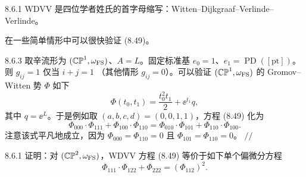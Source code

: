 \begin{wrem}{8.6.1}
WDVV 是四位学者姓氏的首字母缩写：Witten--Dijkgraaf--Verlinde--Verlinde。
\end{wrem}

在一些简单情形中可以很快验证 (8.49)。

\begin{wexam}{8.6.3}
取辛流形为 $(\mathbb{CP}^1,\omega_{\mathrm{FS}})$、$A=L$。固定标准基
$e_0=1$、$e_1=\operatorname{PD}([\mathrm{pt}])$。则 $g_{ij}=1$ 仅当 $i+j=1$
（其他情形 $g_{ij}=0$）。可以验证 $(\mathbb{CP}^1,\omega_{\mathrm{FS}})$ 的 Gromov--Witten
势 $\Phi$ 如下
\[
  \Phi(t_0,t_1)=\frac{t_0^2t_1}{2}+\ee^{t_1}q,
\]
其中 $q=\ee^L$。于是例如取 $(a,b,c,d)=(0,0,1,1)$，方程 (8.49) 化为
\[
  \Phi_{000}\cdot\Phi_{111}+\Phi_{100}\cdot\Phi_{110}
  =\Phi_{010}\cdot\Phi_{101}+\Phi_{110}\cdot\Phi_{100}.
\]
注意该式平凡地成立，因为 $\Phi_{000}=\Phi_{110}=0$ 且 $\Phi_{101}=\Phi_{110}=0$。
\hspace*{\fill}$//$
\end{wexam}

\begin{wexer}{8.6.1}
证明：对 $(\mathbb{CP}^2,\omega_{\mathrm{FS}})$，WDVV 方程 (8.49) 等价于如下单个偏微分方程
\begin{equation}
  \Phi_{111}\cdot\Phi_{122}+\Phi_{222}=(\Phi_{112})^2 .
  \tag{8.50}
\end{equation}
\end{wexer}

